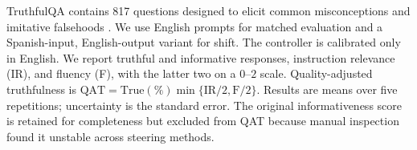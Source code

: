 TruthfulQA contains 817 questions designed to elicit common misconceptions
and imitative falsehoods \citep{lin2022truthfulqa}.  We use English prompts for
matched evaluation and a Spanish-input, English-output variant for shift.  The
controller is calibrated only in English.  We report truthful and informative
responses, instruction relevance (IR), and fluency (F), with the latter two on
a $0$--$2$ scale.  Quality-adjusted truthfulness is
$\mathrm{QAT}=\mathrm{True}(\%)\min\{\mathrm{IR}/2,\mathrm{F}/2\}$.
Results are means over five repetitions; uncertainty is the standard error.
The original informativeness score is retained for completeness but excluded
from QAT because manual inspection found it unstable across steering methods.

\begin{table}[!htbp]
\centering
\scriptsize
\caption{
TruthfulQA under matched English evaluation (ID) and Spanish-input,
English-output transfer (OOD).  Info denotes the original informativeness
judge and is reported for completeness but is not used in QAT.  QAT is
computed from the reported means.  Higher is better for every column.
ODESteer is omitted because the available implementation did not yield a valid
comparison.  Qwen2.5-14B and Qwen2.5-32B blocks are reserved for ongoing runs.
}
\label{tab:truthfulqa-full}
\setlength{\tabcolsep}{4.0pt}
\end{table}
